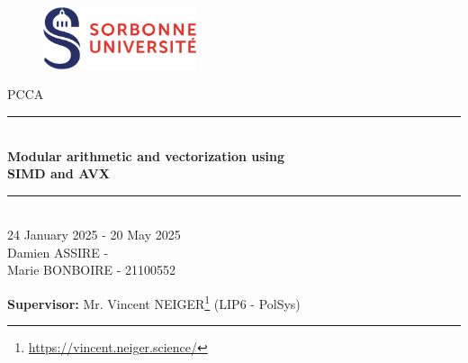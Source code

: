 \documentclass[a4paper]{article}
\begin{document}
\thispagestyle{plain}
\begin{titlepage}
    \begin{figure}[h]
        \centering
        \includegraphics[width=0.4\textwidth]{su.png}
    \end{figure}
    \vspace{1cm}

    \begin{center}
        {\LARGE PCCA}\\[0.3cm]
        \rule{\linewidth}{0.5mm} \\[0.4cm]
        {\huge \textbf{Modular arithmetic and vectorization using\\ SIMD and AVX}}\\[0.4cm]
        \rule{\linewidth}{0.5mm} \\[1cm]
        {\large 24 January 2025 - 20 May 2025}\\[3cm]

        {\Large Damien ASSIRE - \\
                Marie BONBOIRE - 21100552}


    \end{center}

    \vfill
\begin{flushleft}{\large
    \textbf{Supervisor:} Mr. Vincent NEIGER\footnote{\url{https://vincent.neiger.science/}} (LIP6 - PolSys)\\
    }
\end{flushleft}
\end{titlepage}
\newpage

\tableofcontents
\newpage
\end{document}
